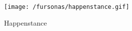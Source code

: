 \begin{figure}
\centering
\texttt{[image: /fursonas/happenstance.gif]}
\caption{Happenstance}
\end{figure}
